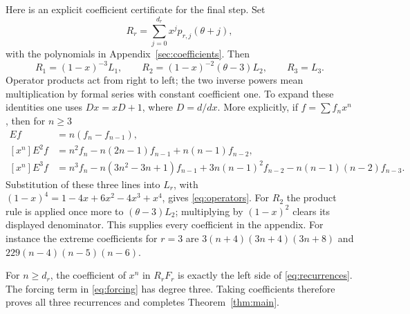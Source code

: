 \documentclass[11pt]{article}
\begin{document}
Here is an explicit coefficient certificate for the final step. Set
\[
 R_r=\sum_{j=0}^{d_r}x^j p_{r,j}(\theta+j),
\]
with the polynomials in Appendix~\ref{sec:coefficients}. Then
\begin{equation}\label{eq:operators}
 R_1=(1-x)^{-3}L_1,\qquad
 R_2=(1-x)^{-2}(\theta-3)L_2,\qquad R_3=L_3.
\end{equation}
Operator products act from right to left; the two inverse powers mean
multiplication by formal series with constant coefficient one.
To expand these identities one uses $Dx=xD+1$, where $D=d/dx$.
More explicitly, if $f=\sum f_nx^n$, then for $n\geq3$
\begin{align*}
 [x^n]Ef&=n(f_n-f_{n-1}),\\
 [x^n]E^2f&=n^2f_n-n(2n-1)f_{n-1}+n(n-1)f_{n-2},\\
 [x^n]E^3f&=n^3f_n-n(3n^2-3n+1)f_{n-1}
             +3n(n-1)^2f_{n-2}-n(n-1)(n-2)f_{n-3}.
\end{align*}
Substitution of these three lines into $L_r$, with
$(1-x)^4=1-4x+6x^2-4x^3+x^4$, gives \eqref{eq:operators}.
For $R_2$ the product rule is applied once more to $(\theta-3)L_2$;
multiplying by $(1-x)^2$ clears its displayed denominator.
This supplies every coefficient in the appendix. For instance the extreme
coefficients for $r=3$ are $3(n+4)(3n+4)(3n+8)$ and
$229(n-4)(n-5)(n-6)$.

For $n\geq d_r$, the coefficient of $x^n$ in $R_rF_r$ is exactly the
left side of \eqref{eq:recurrences}. The forcing term in
\eqref{eq:forcing} has degree three. Taking coefficients therefore proves
all three recurrences and completes Theorem~\ref{thm:main}.
\end{document}
